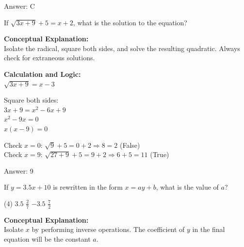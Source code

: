 \documentclass[11pt,paper=a4,answers]{exam}
\begin{document}
\begin{questions}
\begin{solution}
\vspace{25pt}

Answer: \colorbox{yellow!100}{C}
\end{solution}

\vspace{40pt}

\question
If $\sqrt{3x+9} + 5 = x + 2$, what is the solution to the equation?

\begin{solution}
\textbf{Conceptual Explanation:} \\
Isolate the radical, square both sides, and solve the resulting quadratic. Always check for extraneous solutions.

\vspace{20pt}

\textbf{Calculation and Logic:} \\
$\sqrt{3x+9} = x - 3$

\vspace{10pt}

Square both sides: \\
$3x+9 = x^2 - 6x + 9$ \\
$x^2 - 9x = 0$ \\
$x(x-9) = 0$

\vspace{10pt}

Check $x=0$: $\sqrt{9} + 5 = 0 + 2 \Rightarrow 8 = 2$ (False) \\
Check $x=9$: $\sqrt{27+9} + 5 = 9 + 2 \Rightarrow 6 + 5 = 11$ (True)

\vspace{25pt}

Answer: \colorbox{yellow!100}{9}
\end{solution}

\vspace{40pt}

\question
If $y = 3.5x + 10$ is rewritten in the form $x = ay + b$, what is the value of $a$?
\begin{tasks}(4)
    \task $3.5$
    \task $\frac{2}{7}$
    \task $-3.5$
    \task $\frac{7}{2}$
\end{tasks}

\begin{solution}
\textbf{Conceptual Explanation:} \\
Isolate $x$ by performing inverse operations. The coefficient of $y$ in the final equation will be the constant $a$.


\end{solution}
\end{questions}
\end{document}
